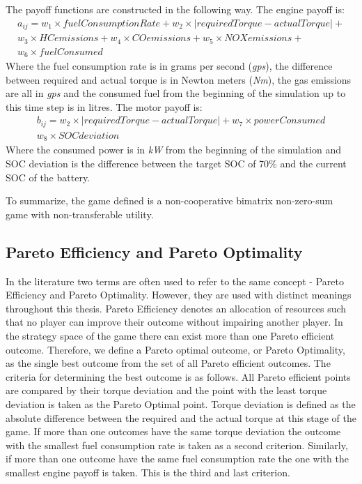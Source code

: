 The payoff functions are constructed in the following way. The engine payoff is:
\begin{equation}
\begin{split}
a_{ij} = w_1 \times fuelConsumptionRate + w_2 \times | requiredTorque - actualTorque | + \\
w_3 \times HCemissions + w_4 \times COemissions + w_5 \times NOXemissions + \\
w_6 \times fuelConsumed
\end{split}
\end{equation}
Where the fuel consumption rate is in grams per second (\textit{gps}), the difference between required and actual torque is in Newton meters (\textit{Nm}), the gas emissions are all in \textit{gps} and the consumed fuel from the beginning of the simulation up to this time step is in litres. The motor payoff is:
\begin{equation}
\begin{split}
b_{ij} = w_2 \times | requiredTorque - actualTorque | + w_7 \times powerConsumed\\
w_8 \times SOCdeviation
\end{split}
\end{equation}
Where the consumed power is in \textit{kW} from the beginning of the simulation and SOC deviation is the difference between the target SOC of 70\% and the current SOC of the battery.

To summarize, the game defined is a non-cooperative bimatrix non-zero-sum game with non-transferable utility.

\subsection{Pareto Efficiency and Pareto Optimality}
In the literature two terms are often used to refer to the same concept - Pareto Efficiency and Pareto Optimality. However, they are used with distinct meanings throughout this thesis. Pareto Efficiency denotes an allocation of resources such that no player can improve their outcome without impairing another player. In the strategy space of the game there can exist more than one Pareto efficient outcome. Therefore, we define a Pareto optimal outcome, or Pareto Optimality, as the single best outcome from the set of all Pareto efficient outcomes. The criteria for determining the best outcome is as follows. All Pareto efficient points are compared by their torque deviation and the point with the least torque deviation is taken as the Pareto Optimal point. Torque deviation is defined as the absolute difference between the required and the actual torque at this stage of the game. If more than one outcomes have the same torque deviation the outcome with the smallest fuel consumption rate is taken as a second criterion. Similarly, if more than one outcome have the same fuel consumption rate the one with the smallest engine payoff is taken. This is the third and last criterion.

